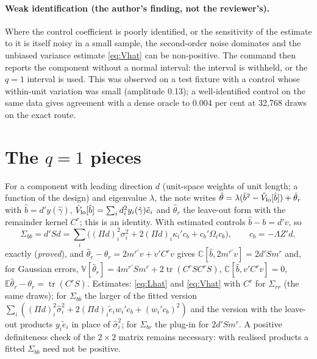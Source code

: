\documentclass[11pt]{article}
\newcommand{\E}{\mathbb{E}}
\newcommand{\Var}{\mathbb{V}}
\newcommand{\Cov}{\mathbb{C}}
\newcommand{\tr}{\operatorname{tr}}
\begin{document}
\paragraph{Weak identification (the author's finding, not the reviewer's).} Where the control coefficient is poorly
identified, or the sensitivity of the estimate to it is itself noisy in a small sample, the second-order noise
dominates and the unbiased variance estimate \eqref{eq:Vhat} can be non-positive. The command then reports the
component without a normal interval: the interval is withheld, or the $q=1$ interval is used. This was observed on a
test fixture with a control whose within-unit variation was small (amplitude 0.13); a well-identified control on the
same data gives agreement with a dense oracle to 0.004 per cent at 32{,}768 draws on the exact route.

\section{The $q=1$ pieces}\label{sec:q1}
For a component with leading direction $d$ (unit-space weights of unit length; a function of the design) and
eigenvalue $\lambda$, the note writes $\hat\theta=\lambda(\hat b^2-\hat V_{\rm lo}[\hat b])+\hat\theta_r$ with
$\hat b=d'y(\hat\gamma)$, $\hat V_{\rm lo}[\hat b]=\sum_id_i^2y_i(\hat\gamma)\tilde e_i$ and $\hat\theta_r$ the leave-out
form with the remainder kernel $C^r$; this is an identity. With estimated controls $\hat b-b=d'v$, so
\[
 \Sigma_{bb}=d'Sd=\sum_i\bigl((\Pi d)_i^2\sigma_i^2+2(\Pi d)_i\kappa_i'c_b+c_b'\Omega_ic_b\bigr),\qquad c_b=-\Lambda Z'd,
\]
exactly (\emph{proved}), and $\hat\theta_r-\theta_r=2m^{r\prime}v+v'C^rv$ gives
$\Cov[\hat b,2m^{r\prime}v]=2d'Sm^r$ and, for Gaussian errors, $\Var[\hat\theta_r]=4m^{r\prime}Sm^r+2\tr(C^rSC^rS)$,
$\Cov[\hat b,v'C^rv]=0$, $\E\hat\theta_r-\theta_r=\tr(C^rS)$. Estimates: \eqref{eq:Lhat} and \eqref{eq:Vhat} with
$C^r$ for $\Sigma_{rr}$ (the same draws); for $\Sigma_{bb}$ the larger of the fitted version
$\sum_i((\Pi d)_i^2\hat\sigma_i^2+2(\Pi d)_i\tilde e_iw_i'c_b+(w_i'c_b)^2)$ and the version with the leave-out
products $y_i\tilde e_i$ in place of $\hat\sigma_i^2$; for $\Sigma_{br}$ the plug-in for $2d'Sm^r$. A positive
definiteness check of the $2\times2$ matrix remains necessary: with realised products a fitted $\Sigma_{bb}$ need
not be positive.
\end{document}
